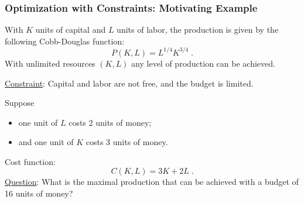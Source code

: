  \begin{frame}
  \frametitle{Optimization with Constraints: Motivating Example}

  With $K$ units of capital and $L$ units of labor, the production is given by the following Cobb-Douglas function:
%
$$P(K,L) = L^{1/4} K^{3/4}\; .$$
%
\pause With unlimited resources $(K,L)$ \pause any level of production can be achieved. \pause

\underline{Constraint}: \pause Capital and labor are not free, and the budget is limited.\pause

Suppose
\begin{itemize}
  \item one  unit of $L$ costs 2 units of money;
  \item and one unit of $K$ costs 3 units of money.
\end{itemize}

\pause Cost function:\pause
%
$$C(K,L) = 3K +2L\; .$$
%
\pause \underline{Question}: What is the maximal production that can be achieved with a budget of 16 units of money?
\end{frame}